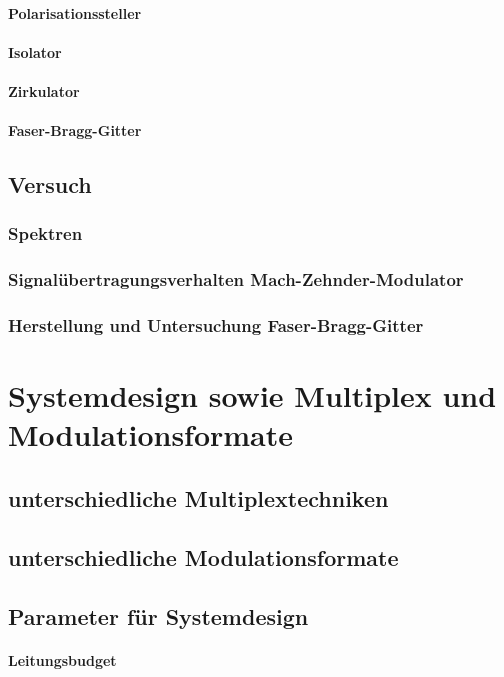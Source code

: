 \documentclass[a4paper]{article}
\begin{document}
\paragraph{Polarisationssteller}
\paragraph{Isolator}
\paragraph{Zirkulator}
\paragraph{Faser-Bragg-Gitter}

\subsection{Versuch}
\subsubsection{Spektren}
\subsubsection{Signalübertragungsverhalten Mach-Zehnder-Modulator}
\subsubsection{Herstellung und Untersuchung Faser-Bragg-Gitter}


\newpage
\section{Systemdesign sowie Multiplex und Modulationsformate}
\subsection{unterschiedliche Multiplextechniken}
\subsection{unterschiedliche Modulationsformate}
\subsection{Parameter für Systemdesign}
\paragraph{Leitungsbudget}
\end{document}
